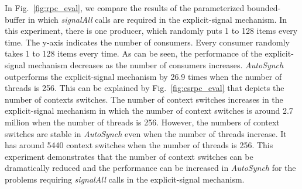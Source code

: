\documentclass{sigplanconf}
\begin{document}
In Fig.~\ref{fig:rpc_eval}, we compare the results of the parameterized 
bounded-buffer in which {\em signalAll} calls are required in the 
explicit-signal mechanism. In this experiment, there is one producer, which
randomly puts 1 to 128 items every time. The y-axis indicates the number of 
consumers. Every consumer randomly takes 1 to 128 items every time. As can be
seen, the performance of the explicit-signal mechanism decreases as the number
of consumers increases. {\em AutoSynch} outperforms the explicit-signal 
mechanism by 26.9 times when the number of threads is 256. This can be explained 
by Fig.~\ref{fig:csrpc_eval} that depicts the number of contexts switches. The
number of context switches increases in the explicit-signal
mechanism in which the number of context switches is around 2.7 million when 
the number of threads is 256. However, the numbers of context switches are stable in {\em
AutoSynch} even when the number of threads increase. It has around 5440 context
switches when the number of threads is 256. This experiment demonstrates
that the number of context switches can be dramatically reduced and the
performance can be increased in {\em AutoSynch} for the problems requiring 
{\em signalAll} calls in the explicit-signal mechanism. 
\end{document}
